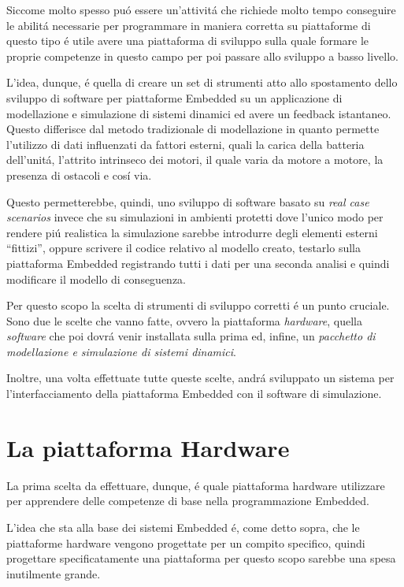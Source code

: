 Siccome molto spesso pu\'o essere un'attivit\'a che richiede molto tempo
conseguire le abilit\'a necessarie per programmare in maniera corretta su
piattaforme di questo tipo \'e utile avere una piattaforma di sviluppo
sulla quale formare le proprie competenze in questo campo per poi passare
allo sviluppo a basso livello.

L'idea, dunque, \'e quella di creare un set di strumenti atto allo
spostamento dello sviluppo di software per piattaforme Embedded su un
applicazione di modellazione e simulazione di sistemi dinamici ed avere un
feedback istantaneo. Questo differisce dal metodo tradizionale di modellazione
in quanto permette l'utilizzo di dati influenzati da fattori esterni, quali
la carica della batteria dell'unit\'a, l'attrito intrinseco dei motori, il
quale varia da motore a motore, la presenza di ostacoli e cos\'i via.

Questo permetterebbe, quindi, uno sviluppo di software basato su \emph{real
case scenarios} invece che su simulazioni in ambienti protetti dove l'unico
modo per rendere pi\'u realistica la simulazione sarebbe introdurre degli
elementi esterni ``fittizi'', oppure scrivere il codice relativo al modello
creato, testarlo sulla piattaforma Embedded registrando tutti i dati per
una seconda analisi e quindi modificare il modello di conseguenza.

Per questo scopo la scelta di strumenti
di sviluppo corretti \'e un punto cruciale. Sono due le scelte che vanno
fatte, ovvero la piattaforma \emph{hardware}, quella \emph{software} che
poi dovr\'a venir installata sulla prima ed, infine, un \emph{pacchetto di
modellazione e simulazione di sistemi dinamici}.

Inoltre, una volta effettuate tutte queste scelte, andr\'a sviluppato un
sistema per l'interfacciamento della piattaforma Embedded con il software
di simulazione.

\section{La piattaforma Hardware}
La prima scelta da effettuare, dunque, \'e quale piattaforma hardware
utilizzare per apprendere delle competenze di base nella programmazione
Embedded.

L'idea che sta alla base dei sistemi Embedded \'e, come detto sopra, che le
piattaforme hardware vengono progettate per un compito specifico, quindi
progettare specificatamente una piattaforma per questo scopo sarebbe una
spesa inutilmente grande.

